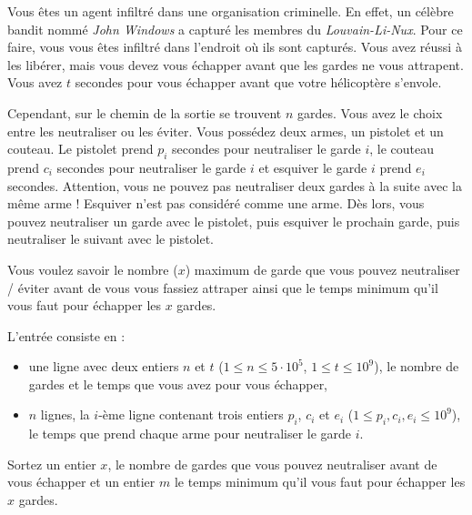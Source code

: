 \problemname{\problemyamlname}


Vous êtes un agent infiltré dans une organisation criminelle. En effet, un célèbre bandit nommé \textit{John Windows} a capturé les membres du \textit{Louvain-Li-Nux}. Pour ce faire, vous vous êtes infiltré dans l'endroit où ils sont capturés. Vous avez réussi à les libérer, mais vous devez vous échapper avant que les gardes ne vous attrapent.  Vous avez $t$ secondes pour vous échapper avant que votre hélicoptère s'envole.

Cependant, sur le chemin de la sortie se trouvent $n$ gardes. Vous avez le choix entre les neutraliser ou les éviter. Vous possédez deux armes, un pistolet et un couteau. Le pistolet prend $p_i$ secondes pour neutraliser le garde $i$, le couteau prend $c_i$ secondes pour neutraliser le garde $i$ et esquiver le garde $i$ prend $e_i$ secondes. Attention, vous ne pouvez pas neutraliser deux gardes à la suite avec la même arme ! Esquiver n'est pas considéré comme une arme. Dès lors, vous pouvez neutraliser un garde avec le pistolet, puis esquiver le prochain garde, puis neutraliser le suivant avec le pistolet.

Vous voulez savoir le nombre ($x$) maximum de garde que vous pouvez neutraliser / éviter avant de vous vous fassiez attraper ainsi que le temps minimum qu'il vous faut pour échapper les $x$ gardes.
\begin{Input}
    L'entrée consiste en :
    \begin{itemize}
        \item une ligne avec deux entiers $n$ et $t$ ($1\leq n \leq 5 \cdot 10^5$, $1\leq t \leq 10^9$), le nombre de gardes et le temps que vous avez pour vous échapper,
        \item $n$ lignes, la $i$-ème ligne contenant trois entiers  $p_i$, $c_i$ et $e_i$ ($1\leq p_i, c_i, e_i \leq 10^9$), le temps que prend chaque arme pour neutraliser le garde $i$.
    \end{itemize}
\end{Input}

\begin{Output}
    Sortez un entier $x$, le nombre de gardes que vous pouvez neutraliser avant de vous échapper et un entier $m$ le temps minimum qu'il vous faut pour échapper les $x$ gardes.
\end{Output}
